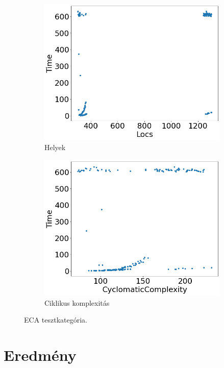 \begin{figure}[ht]
\begin{subfigure}[b]{0.5\linewidth}
		\includegraphics[width=0.95\linewidth]{figures/eca/locs.png} 
		\caption{Helyek} 
	\end{subfigure}%
	\begin{subfigure}[b]{0.5\linewidth}
		\centering
		\includegraphics[width=0.95\linewidth]{figures/eca/cc.png} 
		\caption{Ciklikus komplexitás} 
	\end{subfigure} 
	\caption{ECA tesztkategória.\label{fig_eca} }
\end{figure}

\section{Eredmény}

